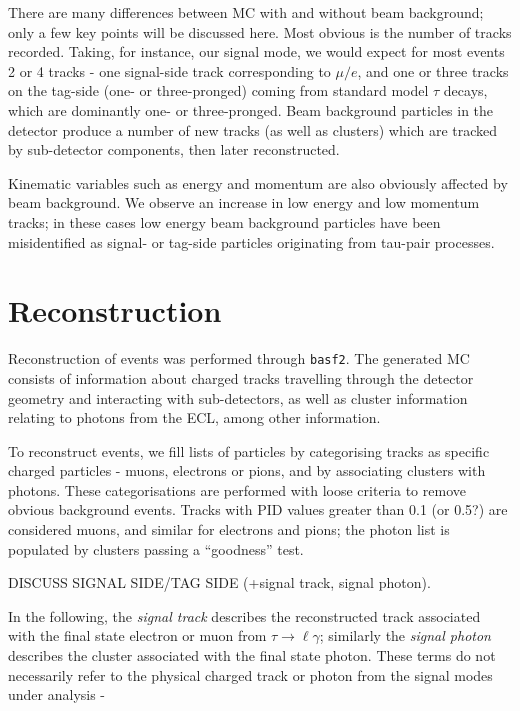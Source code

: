 \documentclass[12pt]{thesis}  %
\begin{document}
    
    
    
There are many differences between MC with and without beam background; only a few key points will be discussed here. Most obvious is the number of tracks recorded. Taking, for instance, our signal mode, we would expect for most events 2 or 4 tracks - one signal-side track corresponding to $\mu/e$, and one or three tracks on the tag-side (one- or three-pronged) coming from standard model $\tau$ decays, which are dominantly one- or three-pronged. Beam background particles in the detector produce a number of new tracks (as well as clusters) which are tracked by sub-detector components, then later reconstructed.

Kinematic variables such as energy and momentum are also obviously affected by beam background. We observe an increase in low energy and low momentum tracks; in these cases low energy beam background particles have been misidentified as signal- or tag-side particles originating from tau-pair processes.





\pagebreak

\chapter{Reconstruction}

Reconstruction of events was performed through \texttt{basf2}. The generated MC consists of information about charged tracks travelling through the detector geometry and interacting with sub-detectors, as well as cluster information relating 
to photons from the ECL, among other information. 

To reconstruct events, we fill lists of particles by categorising tracks as specific charged particles - muons, electrons or pions, and by associating clusters with photons. These categorisations are performed with loose criteria to remove obvious background events. Tracks with PID values greater than 0.1 (or 0.5?) are considered muons, and similar for electrons and pions; the photon list is populated by clusters passing a ``goodness'' test. 



DISCUSS SIGNAL SIDE/TAG SIDE (+signal track, signal photon).


In the following, the \emph{signal track} describes the reconstructed track associated with the final state electron or muon from $\tau\to\ell\gamma$; similarly the \emph{signal photon} describes the cluster associated with the final state photon. These terms do not necessarily refer to the physical charged track or photon from the signal modes under analysis - 
\end{document}
